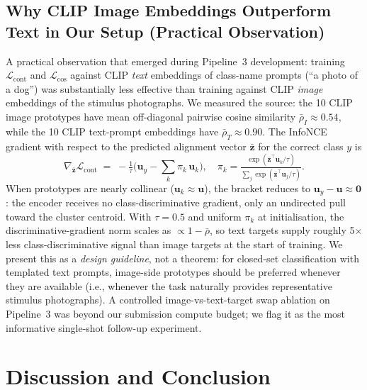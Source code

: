 \documentclass{article}
\begin{document}
\subsection{Why CLIP Image Embeddings Outperform Text in Our Setup (Practical Observation)}
\label{sec:analysis}

A practical observation that emerged during Pipeline~3 development: training $\mathcal{L}_\mathrm{cont}$ and $\mathcal{L}_\mathrm{cos}$ against CLIP \emph{text} embeddings of class-name prompts (``a photo of a dog'') was substantially less effective than training against CLIP \emph{image} embeddings of the stimulus photographs. We measured the source: the 10 CLIP image prototypes have mean off-diagonal pairwise cosine similarity $\bar{\rho}_I\!\approx\!0.54$, while the 10 CLIP text-prompt embeddings have $\bar{\rho}_T\!\approx\!0.90$. The InfoNCE gradient with respect to the predicted alignment vector $\bar{\mathbf{z}}$ for the correct class $y$ is
\begin{equation}
\nabla_{\bar{\mathbf{z}}}\mathcal{L}_\mathrm{cont}
\;=\;-\tfrac{1}{\tau}\Big(\mathbf{u}_y - \textstyle\sum_{k}\pi_k\,\mathbf{u}_k\Big),\quad
\pi_k = \tfrac{\exp(\bar{\mathbf{z}}^\top\mathbf{u}_k/\tau)}{\sum_{j}\exp(\bar{\mathbf{z}}^\top\mathbf{u}_j/\tau)}.
\label{eq:gradient}
\end{equation}
When prototypes are nearly collinear ($\mathbf{u}_k\!\approx\!\mathbf{u}$), the bracket reduces to $\mathbf{u}_y-\mathbf{u}\!\approx\!\mathbf{0}$: the encoder receives no class-discriminative gradient, only an undirected pull toward the cluster centroid. With $\tau{=}0.5$ and uniform $\pi_k$ at initialisation, the discriminative-gradient norm scales as $\propto 1{-}\bar{\rho}$, so text targets supply roughly 5$\times$ less class-discriminative signal than image targets at the start of training. We present this as a \emph{design guideline}, not a theorem: for closed-set classification with templated text prompts, image-side prototypes should be preferred whenever they are available (i.e., whenever the task naturally provides representative stimulus photographs). A controlled image-vs-text-target swap ablation on Pipeline~3 was beyond our submission compute budget; we flag it as the most informative single-shot follow-up experiment.

\section{Discussion and Conclusion}
\end{document}
